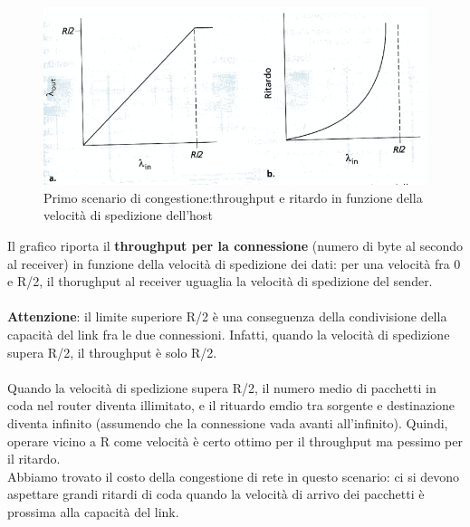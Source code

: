 \documentclass[11pt,a4paper]{book}
\begin{document}
\begin{figure}
	\includegraphics[scale=0.6]{img/040.png}
	\caption{Primo scenario di congestione:throughput e ritardo in funzione della velocità di spedizione dell'host}
\end{figure}
Il grafico riporta il \textbf{throughput per la connessione} (numero di byte al secondo al receiver) in funzione della velocità di spedizione dei dati: per una velocità fra 0 e R/2, il thorughput al receiver uguaglia la velocità di spedizione del sender. \\ \\
\textbf{Attenzione}: il limite superiore R/2 è una conseguenza della condivisione della capacità del link fra le due connessioni. Infatti, quando la velocità di spedizione supera R/2, il throughput è solo R/2. \\ \\
Quando la velocità di spedizione supera R/2, il numero medio di pacchetti in coda nel router diventa illimitato, e il rituardo emdio tra sorgente e destinazione diventa infinito (assumendo che la connessione vada avanti all'infinito). Quindi, operare vicino a R come velocità è certo ottimo per il throughput ma pessimo per il ritardo. \\
Abbiamo trovato il costo della congestione di rete in questo scenario: ci si devono aspettare grandi ritardi di coda quando la velocità di arrivo dei pacchetti è prossima alla capacità del link.
\end{document}
